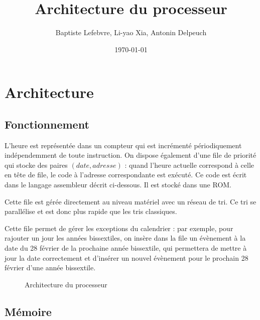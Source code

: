 \documentclass[a4paper]{article}
\begin{document}
\title{Architecture du processeur}
\author{Baptiste Lefebvre, Li-yao Xia, Antonin Delpeuch}
\date{\today}

\maketitle

\section{Architecture}

\subsection{Fonctionnement}

L'heure est représentée dans un compteur qui est incrémenté
périodiquement indépendemment de toute instruction.
On dispose également d'une file de priorité qui stocke des paires $(date,
adresse)$ : quand l'heure actuelle correspond à celle en tête de file, le
code à l'adresse correspondante est exécuté. Ce code est écrit dans le
langage assembleur décrit ci-dessous. Il est stocké dans une ROM.

Cette file est gérée directement au niveau matériel avec un r\'{e}seau de
tri. Ce tri se parallélise et est donc plus rapide que les tris classiques.

Cette file permet de gérer les exceptions du calendrier : par exemple,
pour rajouter un jour les années bissextiles, on insère dans la file un
évènement à la date du 28 février de la prochaine année bissextile,
qui permettera de mettre à jour la date correctement et d'insérer un nouvel évènement pour
le prochain 28 février d'une année bissextile.

\begin{figure}
    \centering
    \caption{Architecture du processeur}
\end{figure}


\subsection{Mémoire}
\end{document}
